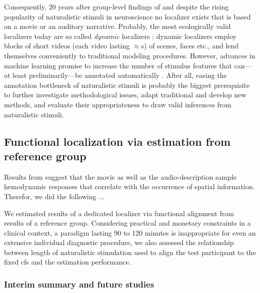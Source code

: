 %
Consequently, 20 years after group-level findings of \citep{bartels2004mapping}
and despite the rising popularity of naturalistic stimuli in neuroscience no
localizer exists that is based on a movie or an auditory narrative.
%
Probably, the most ecologically valid localizers today are so called
\textit{dynamic} localizers \citep[e.g.,][]{pitcher2011differential,
fox2009defining}:
%
dynamic localizers employ blocks of short videos (each video lasting
$\approx$\unit[2-3]{s}) of scenes, faces etc., and lend themselves conveniently
to traditional modeling procedures.
%
However, advances in machine learning promise to increase the number of stimulus
features that can---at least preliminarily---be annotated automatically
\citep[cf. \href{https://neuroscout.org/}{\url{neuroscout.org}}
platform;][]{delavega2022neuroscout}.
%
After all, easing the annotation bottleneck of naturalistic stimuli is probably
the biggest prerequisite to further investigate methodological issues, adapt
traditional and develop new methods, and evaluate their appropriateness to draw
valid inferences from naturalistic stimuli.



\subsection{Functional localization via estimation from reference group}



%
Results from \citet{haeusler2022processing} suggest that the movie as well as
the audio-description sample hemodynamic responses that correlate with the
occurrence of spatial information.
%
Therefor, we did the following ...

We estimated results of a dedicated localizer \citep{sengupta2016extension} via
functional alignment from results of a reference group.
Considering practical and monetary constraints in a clinical context, a paradigm
lasting 90 to 120 minutes is inappropriate for even an extensive individual
diagnostic procedure, we also assessed the relationship between length of
naturalistic stimulation used to align the test participant to the fixed
\ac{cfs} and the estimation performance.



\subsubsection{Interim summary and future studies}

